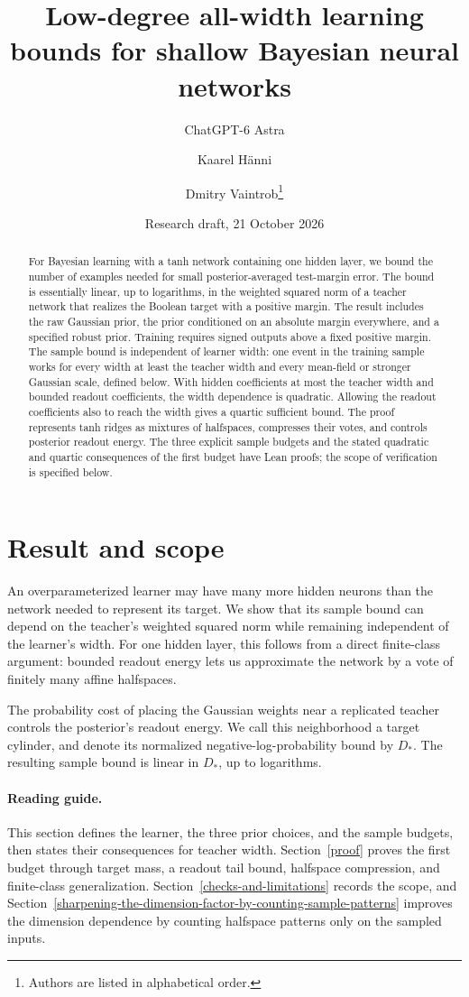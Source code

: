 \documentclass[11pt]{article}
\author{ChatGPT-6 Astra \and Kaarel H\"anni \and Dmitry Vaintrob\thanks{Authors are listed in alphabetical order.}}
\date{Research draft, 21 October 2026}
\title{Low-degree all-width learning bounds for shallow Bayesian neural networks}
\begin{document}
\maketitle
\begin{abstract}
For Bayesian learning with a tanh network containing one hidden layer,
we bound the number of examples needed for small posterior-averaged
test-margin error. The bound is essentially linear, up to logarithms, in
the weighted squared norm of a teacher network that realizes the Boolean
target with a positive margin. The result includes the raw Gaussian prior, the prior
conditioned on an absolute margin everywhere, and a specified robust prior.
Training requires signed outputs above a fixed positive margin. The sample
bound is independent of learner width: one event in the training sample
works for every width at least the teacher width and every mean-field or
stronger Gaussian scale, defined below. With hidden coefficients at most the teacher width
and bounded readout coefficients, the width dependence is quadratic.
Allowing the readout coefficients also to reach the width gives a quartic
sufficient bound. The proof represents tanh ridges as
mixtures of halfspaces, compresses their votes, and controls posterior
readout energy. The three explicit sample budgets and the stated
quadratic and quartic consequences of the first budget have Lean proofs;
the scope of verification is specified below.
\end{abstract}
\section{Result and scope}\label{result-and-scope}

An overparameterized learner may have many more hidden neurons than the
network needed to represent its target. We show that its sample bound can
depend on the teacher's weighted squared norm while remaining independent
of the learner's width. For one hidden layer, this follows from a direct
finite-class argument: bounded readout energy lets us approximate the
network by a vote of finitely many affine halfspaces.

The probability cost of placing the Gaussian weights near a replicated
teacher controls the posterior's readout energy. We call this neighborhood
a target cylinder, and denote its normalized negative-log-probability
bound by \(D_*\). The resulting sample bound is linear in \(D_*\), up to
logarithms.

\paragraph{Reading guide.}
This section defines the learner, the three prior choices, and the sample
budgets, then states their consequences for teacher width.
Section~\ref{proof} proves the first budget through target mass, a readout
tail bound, halfspace compression, and finite-class generalization.
Section~\ref{checks-and-limitations} records the scope, and
Section~\ref{sharpening-the-dimension-factor-by-counting-sample-patterns}
improves the dimension dependence by counting halfspace patterns only on
the sampled inputs.
\end{document}
